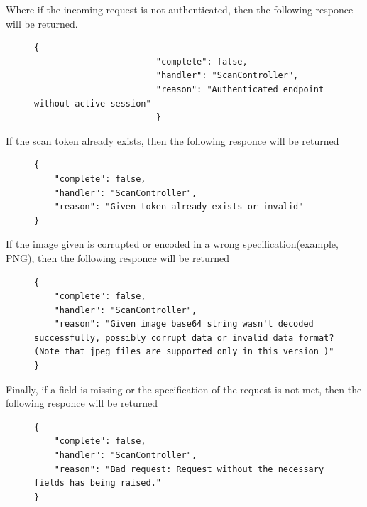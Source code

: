					Where if the incoming request is not authenticated, then the following responce will be returned.
					\begin{figure}[H]
						\iftrue
						\begin{lstlisting}[]
						{
						"complete": false,
						"handler": "ScanController",
						"reason": "Authenticated endpoint without active session"
						}						
						\end{lstlisting}
					\end{figure}
					If the scan token already exists, then the following responce will be returned
					\begin{figure}[H]
						\iftrue
						\begin{lstlisting}[]
{
	"complete": false,
	"handler": "ScanController",
	"reason": "Given token already exists or invalid"
}						
						\end{lstlisting}
					\end{figure}
					If the image given is corrupted or encoded in a wrong specification(example, PNG), then the following responce
					will be returned
					\begin{figure}[H]
						\iftrue
						\begin{lstlisting}[]
{
	"complete": false,
	"handler": "ScanController",
	"reason": "Given image base64 string wasn't decoded successfully, possibly corrupt data or invalid data format? (Note that jpeg files are supported only in this version )"
}						
						\end{lstlisting}
					\end{figure}
					Finally, if a field is missing or the specification of the request is not met, then the following responce will be returned
					\begin{figure}[H]
						\iftrue
						\begin{lstlisting}[]
{
	"complete": false,
	"handler": "ScanController",
	"reason": "Bad request: Request without the necessary fields has being raised."
}					
						\end{lstlisting}
					\end{figure}
